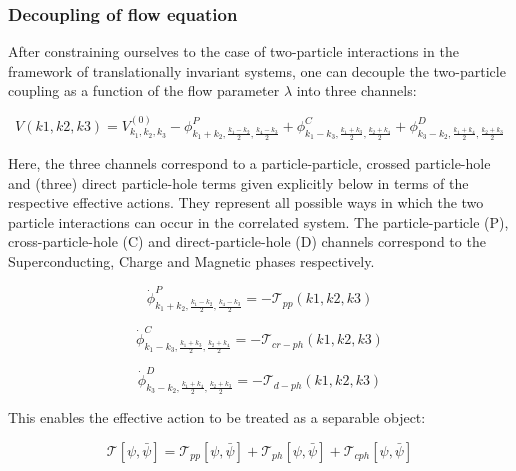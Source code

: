 \documentclass[12pt]{article}
\begin{document}
\subsubsection{Decoupling of flow equation}
After constraining ourselves to the case of two-particle interactions in the framework of translationally invariant systems, one can decouple the two-particle coupling as a function of the flow parameter $\lambda$ into three channels:

\begin{equation} \label{V decoupling}
    V(k1,k2,k3)= V_{k_1, k_2, k_3}^{(0)} - \phi^{P}_{k_1 +k_2, \frac{k_1 - k_2}{2}, \frac{k_4-k_3}{2}} + \phi^{C}_{k_1 - k_3, \frac{k_1 +k_3}{2}, \frac{k_2+k_4}{2}} +\phi^{D}_{k_3- k_2, \frac{k_1 + k_4}{2}, \frac{k_2+k_3}{2}}
\end{equation}

\noindent Here, the three channels correspond to a particle-particle, crossed particle-hole and (three) direct particle-hole terms given explicitly below in terms of the respective effective actions. They represent all possible ways in which the two particle interactions can occur in the correlated system. The particle-particle (P), cross-particle-hole (C) and direct-particle-hole (D) channels
correspond to the Superconducting, Charge and Magnetic phases respectively. 

\begin{equation}
    \dot{\phi}^{P}_{k_1 +k_2, \frac{k_1 - k_2}{2}, \frac{k_4-k_3}{2}} = - \mathcal{T}_{pp}(k1,k2,k3)
\end{equation}


\begin{equation}
    \dot{\phi}^{C}_{k_1 - k_3, \frac{k_1 +k_3}{2}, \frac{k_2+k_4}{2}} = - \mathcal{T}_{cr-ph}(k1,k2,k3)
\end{equation}

\begin{equation}
    \dot{\phi}^{D}_{k_3- k_2, \frac{k_1 + k_4}{2}, \frac{k_2+k_3}{2}} = - \mathcal{T}_{d-ph}(k1,k2,k3)
\end{equation}

\noindent This enables the effective action to be treated as a separable object:

\begin{equation}
    \mathcal{T}[\psi, \bar{\psi}] = \mathcal{T}_{pp}[\psi, \bar{\psi}] + \mathcal{T}_{ph}[\psi, \bar{\psi}] + \mathcal{T}_{cph}[\psi, \bar{\psi}]
\end{equation}

\medskip
\end{document}
